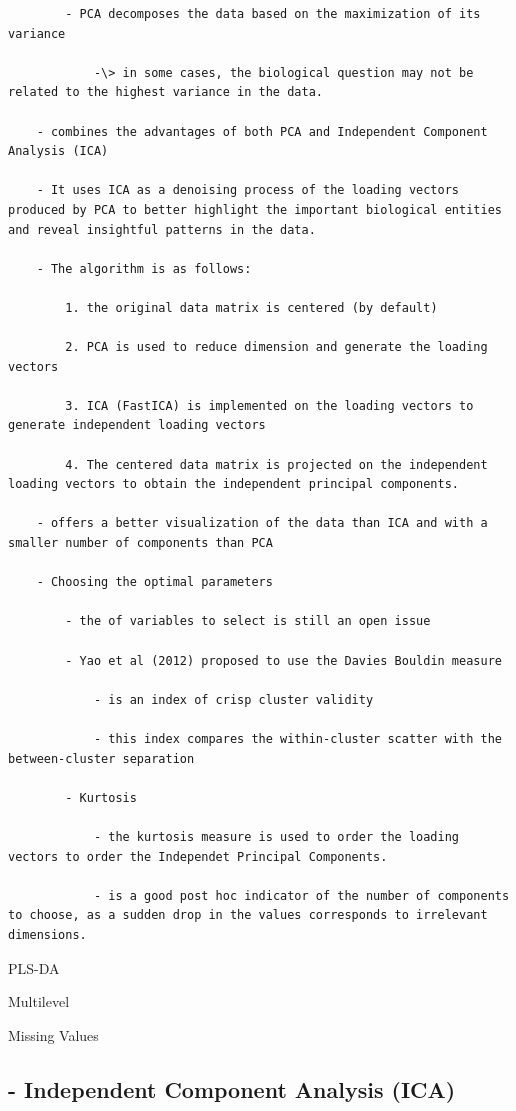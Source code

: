 \documentclass[
]{book}
\begin{document}
\begin{verbatim}
        - PCA decomposes the data based on the maximization of its variance

            -\> in some cases, the biological question may not be related to the highest variance in the data.

    - combines the advantages of both PCA and Independent Component Analysis (ICA)

    - It uses ICA as a denoising process of the loading vectors produced by PCA to better highlight the important biological entities and reveal insightful patterns in the data.

    - The algorithm is as follows:

        1. the original data matrix is centered (by default)

        2. PCA is used to reduce dimension and generate the loading vectors

        3. ICA (FastICA) is implemented on the loading vectors to generate independent loading vectors

        4. The centered data matrix is projected on the independent loading vectors to obtain the independent principal components.

    - offers a better visualization of the data than ICA and with a smaller number of components than PCA

    - Choosing the optimal parameters

        - the of variables to select is still an open issue

        - Yao et al (2012) proposed to use the Davies Bouldin measure

            - is an index of crisp cluster validity

            - this index compares the within-cluster scatter with the between-cluster separation

        - Kurtosis

            - the kurtosis measure is used to order the loading vectors to order the Independet Principal Components.

            - is a good post hoc indicator of the number of components to choose, as a sudden drop in the values corresponds to irrelevant dimensions.
\end{verbatim}

PLS-DA

Multilevel

Missing Values

\hypertarget{independent-component-analysis-ica}{%
\subsection{- Independent Component Analysis (ICA)}\label{independent-component-analysis-ica}}
\end{document}
